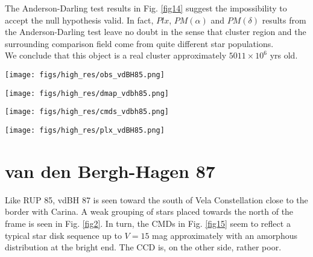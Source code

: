 \documentclass{aa}
\begin{document}
The Anderson-Darling test results in Fig. \ref{fig14} suggest the impossibility
to accept the null hypothesis valid. In fact, $Plx$, $PM(\alpha)$ and
$PM(\delta)$ results from the Anderson-Darling test leave no doubt in the sense
that cluster region and the surrounding comparison field come from quite
different star populations.\\

We conclude that this object is a real cluster approximately $5011\times10^6$
yrs old.

\begin{figure*}[ht]
    \centering
    \texttt{[image: figs/high\_res/obs\_vdBH85.png]}
    \caption{Idem Fig. \ref{fig3} for vdBH 85.}
    \label{fig11}
\end{figure*}

\begin{figure*}[ht]
    \centering
    \texttt{[image: figs/high\_res/dmap\_vdbh85.png]}
    \caption{Idem Fig. \ref{fig4} for vdBH 85.}
    \label{fig12}
\end{figure*}

\begin{figure*}[ht]
    \centering
    \texttt{[image: figs/high\_res/cmds\_vdbh85.png]}
    \caption{Idem Fig. \ref{fig5} for vdBH 85.}
    \label{fig13}
\end{figure*}

\begin{figure*}[ht]
    \centering
    \texttt{[image: figs/high\_res/plx\_vdBH85.png]}
    \caption{Idem Fig. \ref{fig6} for vdBH 85.}
    \label{fig14}
\end{figure*}



\section{van den Bergh-Hagen 87}

Like RUP 85, vdBH 87 is seen toward the south of Vela
Constellation close to the border with Carina. A weak grouping of stars placed
towards the north of the frame is seen in Fig. \ref{fig2}. In turn, the CMDs in
Fig. \ref{fig15} seem to reflect a typical star disk sequence up to $V = 15$ mag
approximately with an amorphous distribution at the bright end. The CCD is, on
the other side, rather poor.\\
\end{document}
